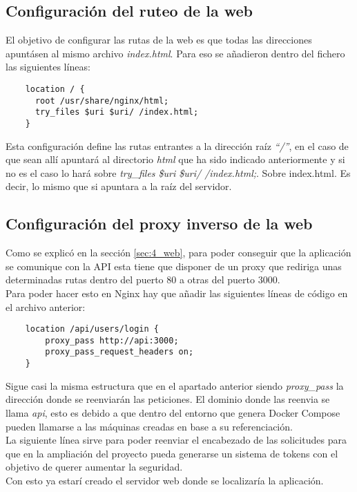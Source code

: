 \subsection{Configuración del ruteo de la web}
El objetivo de configurar las rutas de la web es que todas las direcciones apuntásen al mismo archivo \textit{index.html}. Para eso se añadieron dentro del fichero las siguientes líneas:
\begin{verbatim}
    location / {
      root /usr/share/nginx/html;
      try_files $uri $uri/ /index.html;
    }
\end{verbatim}
Esta configuración define las rutas entrantes a la dirección raíz \textit{``/''}, en el caso de que sean allí apuntará al directorio \textit{html} que ha sido indicado anteriormente y si no es el caso lo hará sobre \textit{try\_files \$uri \$uri/ /index.html;}. Sobre index.html. Es decir, lo mismo que si apuntara a la raíz del servidor.

\subsection{Configuración del proxy inverso de la web}
Como se explicó en la sección \ref{sec:4_web}, para poder conseguir que la aplicación se comunique con la API esta tiene que disponer de un proxy que rediriga unas determinadas rutas dentro del puerto 80 a otras del puerto 3000.
\\Para poder hacer esto en Nginx hay que añadir las siguientes líneas de código en el archivo anterior:
\begin{verbatim}
    location /api/users/login {
        proxy_pass http://api:3000;
        proxy_pass_request_headers on;
    }
\end{verbatim}
Sigue casi la misma estructura que en el apartado anterior siendo \textit{proxy\_pass} la dirección donde se reenviarán las peticiones. El dominio donde las reenvia se llama \textit{api}, esto es debido a que dentro del entorno que genera Docker Compose pueden llamarse a las máquinas creadas en base a su referenciación.
\\La siguiente línea sirve para poder reenviar el encabezado de las solicitudes para que en la ampliación del proyecto pueda generarse un sistema de tokens con el objetivo de querer aumentar la seguridad.
\\Con esto ya estarí creado el servidor web donde se localizaría la aplicación.
